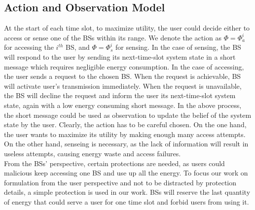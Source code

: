\documentclass[conference]{IEEEtran}
\begin{document}
\subsection{Action and Observation Model}
At the start of each time slot,
to maximize utility, the user could decide either to access or sense one of the BSs within its range.
We denote the action as \(\Phi = \Phi_{a}^i\) for accessing the \(i^{th}\) BS,
and \(\Phi = \Phi_{s}^i\) for sensing.
In the case of sensing,
the BS will respond to the user by sending its next-time-slot system state
in a short message which requires negligible energy consumption.
In the case of accessing, the user sends a request to the chosen BS.
When the request is achievable, BS will activate user's transmission immediately.
When the request is unavailable, the BS will decline the request and
inform the user its next-time-slot system state, again with a low energy consuming short message.
In the above process, the short message could
be used as observation to update the belief of the system state by the user.
Clearly, the action has to be careful chosen.
On the one hand, the user wants to maximize its utility by making enough many access attempts.
On the other hand, senseing is necessary,
as the lack of information will result in useless attempts, causing energy waste and access failures.\\
\indent
From the BSs' perspective, certain protections are needed,
as users could malicious keep accessing one BS and use up all the energy.
To focus our work on formulation from the user perspective and
not to be distracted by protection details,
a simple protection is used in our work.
BSs will reserve the last quantity of energy that could serve a user
for one time slot and forbid users from using it.
\end{document}
